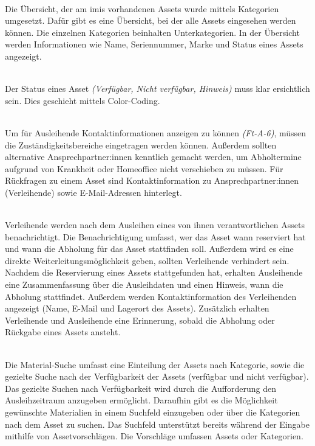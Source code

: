     {\sffamily\color{maincolor}{Ft-VA-2 | Übersicht über ausleihbare Assets }}\\
Die Übersicht, der am \ac{imis} vorhandenen Assets wurde mittels Kategorien umgesetzt. Dafür gibt es
eine Übersicht, bei der alle Assets eingesehen werden können. Die einzelnen Kategorien beinhalten
Unterkategorien. In der Übersicht werden Informationen wie Name, Seriennummer, Marke und Status
eines Assets angezeigt.

    {\sffamily\color{maincolor}{Ft-VA-3 |  Verfügbarkeit von Assets }}\\
Der Status eines Asset \textit{(Verfügbar, Nicht verfügbar, Hinweis)} muss klar ersichtlich sein.
Dies geschieht mittels Color-Coding.  


{\sffamily\color{maincolor}{Ft-VA-4 | Zuständigkeitsbereich }}\\
Um für Ausleihende Kontaktinformationen anzeigen zu können \textit{(Ft-A-6)}, müssen die
Zuständigkeitsbereiche eingetragen werden können. Außerdem sollten alternative Ansprechpartner:innen
kenntlich gemacht werden, um Abholtermine aufgrund von Krankheit oder Homeoffice nicht verschieben
zu müssen. Für Rückfragen zu einem Asset sind Kontaktinformation zu Ansprechpartner:innen
(Verleihende) sowie E-Mail-Adressen hinterlegt.

{\sffamily\color{maincolor}{Ft-VA-5 | Benachrichtigungen \& Erinnerungen }}\\
Verleihende werden nach dem Ausleihen eines von ihnen verantwortlichen Assets benachrichtigt. Die
Benachrichtigung umfasst, wer das Asset wann reserviert hat und wann die Abholung für
das Asset stattfinden soll. Außerdem wird es eine direkte Weiterleitungsmöglichkeit geben, sollten
Verleihende verhindert sein. Nachdem die Reservierung eines Assets stattgefunden hat, erhalten
Ausleihende eine Zusammenfassung über die Ausleihdaten und einen Hinweis, wann die Abholung
stattfindet. Außerdem werden Kontaktinformation des Verleihenden angezeigt (Name, E-Mail und
Lagerort des Assets). Zusätzlich erhalten Verleihende und Ausleihende eine Erinnerung, sobald die
Abholung oder Rückgabe eines Assets ansteht.


    {\sffamily\color{maincolor}{Ft-VA-6 | Material-Suche }}\\
Die Material-Suche umfasst eine Einteilung der Assets nach Kategorie, sowie die gezielte Suche nach
der Verfügbarkeit der Assets (verfügbar und nicht verfügbar). Das gezielte Suchen nach
Verfügbarkeit wird durch die Aufforderung den Ausleihzeitraum anzugeben ermöglicht. Daraufhin gibt
es die Möglichkeit gewünschte Materialien in einem Suchfeld einzugeben oder über die Kategorien nach
dem Asset zu suchen. Das Suchfeld unterstützt bereits während der Eingabe mithilfe von
Assetvorschlägen. Die Vorschläge umfassen Assets oder Kategorien. 

